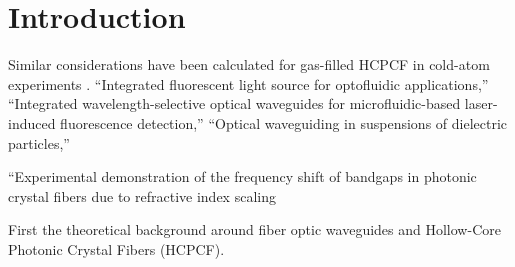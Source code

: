 \chapter{Introduction}
Similar considerations have been calculated for gas-filled HCPCF in cold-atom experiments \cite{bajcsy, hilton}.
\cite{vezenov}“Integrated fluorescent light source for optofluidic applications,” 
\cite{bliss} “Integrated wavelength-selective optical waveguides for microfluidic-based laser-induced fluorescence detection,” 
\cite{conroy}“Optical waveguiding in suspensions of dielectric particles,” 

\cite{antonopoulos} “Experimental demonstration of the frequency shift of bandgaps in photonic crystal fibers due to refractive index scaling

First the theoretical background around fiber optic waveguides and Hollow-Core Photonic Crystal Fibers (HCPCF). 